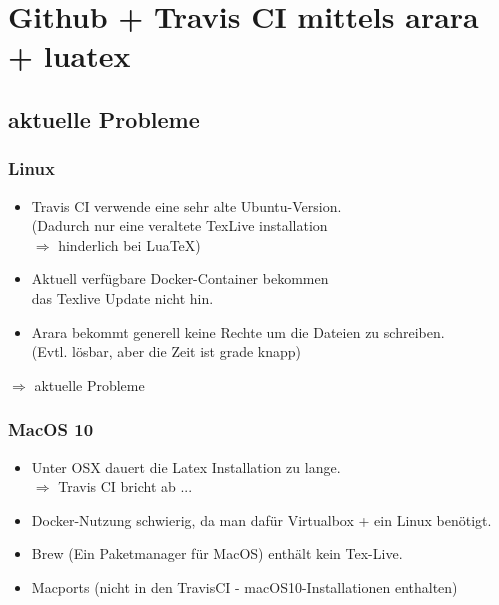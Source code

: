 \newpage

\section{Github + Travis CI mittels arara + luatex}
\subsection{aktuelle Probleme}
\subsubsection{Linux}
\begin{itemize}
  \item Travis CI verwende eine sehr alte Ubuntu-Version.\\ (Dadurch nur eine veraltete TexLive installation\\ $\Rightarrow$ hinderlich bei Lua\TeX)
  \item Aktuell verfügbare Docker-Container bekommen \\das Texlive Update nicht hin.
  \item Arara bekommt generell keine Rechte um die Dateien zu schreiben. \\
  (Evtl. lösbar, aber die Zeit ist grade knapp)
\end{itemize}

\newpage
$\Rightarrow$ aktuelle Probleme
\subsubsection{MacOS 10}
\begin{itemize}
  \item Unter OSX dauert die Latex Installation zu lange. \\ $\Rightarrow$ Travis CI bricht ab ...
  \item Docker-Nutzung schwierig, da man dafür Virtualbox + ein Linux benötigt.
  \item Brew (Ein Paketmanager für MacOS) enthält kein Tex-Live.
  \item Macports (nicht in den TravisCI - macOS10-Installationen enthalten)
\end{itemize}


\newpage %









